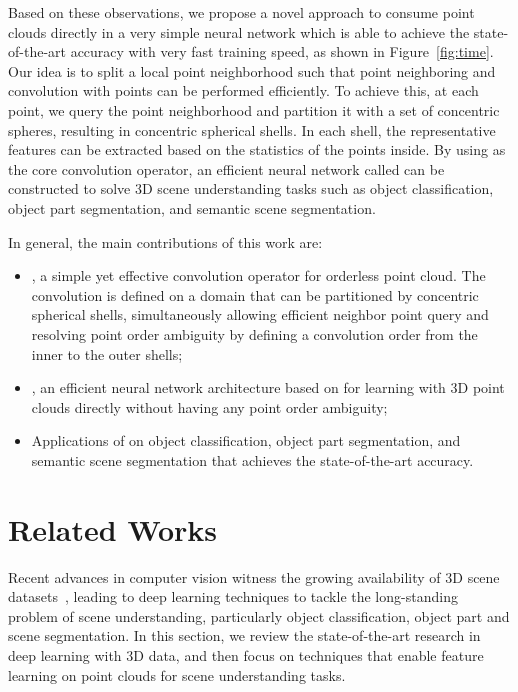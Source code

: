 \documentclass[10pt,twocolumn,letterpaper]{article}
\begin{document}
Based on these observations, we propose a novel approach to consume point clouds directly in a very simple neural network which is able to achieve the state-of-the-art accuracy with very fast training speed, as shown in Figure~\ref{fig:time}. 
Our idea is to split a local point neighborhood such that point neighboring and convolution with points can be performed efficiently.
To achieve this, at each point, we query the point neighborhood and partition it with a set of concentric spheres, resulting in concentric spherical shells. In each shell, the representative features can be extracted based on the statistics of the points inside. By using \ourconv as the core convolution operator, an efficient neural network called \ournet can be constructed to solve 3D scene understanding tasks such as object classification, object part segmentation, and semantic scene segmentation.

In general, the main contributions of this work are:
\begin{itemize}[leftmargin=*]


\item \ourconv, a simple yet effective convolution operator for orderless point cloud. The convolution is defined on a domain that can be partitioned by concentric spherical shells, simultaneously allowing efficient neighbor point query and resolving point order ambiguity by defining a convolution order from the inner to the outer shells;

\item \ournet, an efficient neural network architecture based on \ourconv for learning with 3D point clouds directly without having any point order ambiguity;

\item Applications of \ournet on object classification, object part segmentation, and semantic scene segmentation that achieves the state-of-the-art accuracy.
\end{itemize}



\section{Related Works}
\label{related_works}
Recent advances in computer vision witness the growing availability of 3D scene datasets~\cite{armeni-parsing-cvpr16, wu-3dshapenets-cvpr15, yi2016scalable}, leading to deep learning techniques to tackle the long-standing problem of scene understanding, particularly object classification, object part and scene segmentation. 
In this section, we review the state-of-the-art research in deep learning with 3D data, and then focus on techniques that enable feature learning on point clouds for scene understanding tasks. 
\end{document}
